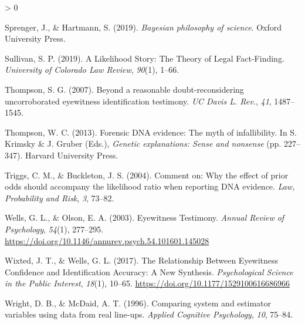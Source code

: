 \documentclass[
  10pt,
  dvipsnames,enabledeprecatedfontcommands]{scrartcl}
\newlength{\cslhangindent}
\newenvironment{CSLReferences}[2] %
 {%
  \setlength{\parindent}{0pt}
  \ifodd #1 \everypar{\setlength{\hangindent}{\cslhangindent}}\ignorespaces\fi
  \ifnum #2 > 0
  \setlength{\parskip}{#2\baselineskip}
  \fi
 }%
 {}
\begin{document}
\begin{CSLReferences}{1}{0}
\leavevmode\hypertarget{ref-sprenger2019bayesian}{}%
Sprenger, J., \& Hartmann, S. (2019). \emph{Bayesian philosophy of
science}. Oxford University Press.

\leavevmode\hypertarget{ref-sullivan2016LikelihoodStoryTheory}{}%
Sullivan, S. P. (2019). A {Likelihood Story}: {The Theory} of {Legal
Fact}-{Finding}. \emph{University of Colorado Law Review}, \emph{90}(1),
1--66.

\leavevmode\hypertarget{ref-thompson2007beyond}{}%
Thompson, S. G. (2007). Beyond a reasonable doubt-reconsidering
uncorroborated eyewitness identification testimony. \emph{UC Davis L.
Rev.}, \emph{41}, 1487--1545.

\leavevmode\hypertarget{ref-thompson2012forensic}{}%
Thompson, W. C. (2013). Forensic {DNA} evidence: The myth of
infallibility. In S. Krimsky \& J. Gruber (Eds.), \emph{Genetic
explanations: Sense and nonsense} (pp. 227--347). Harvard University
Press.

\leavevmode\hypertarget{ref-triggsCommentWhyEffect}{}%
Triggs, C. M., \& Buckleton, J. S. (2004). Comment on: {Why} the effect
of prior odds should accompany the likelihood ratio when reporting {DNA}
evidence. \emph{Law, Probability and Risk}, \emph{3}, 73--82.

\leavevmode\hypertarget{ref-wells2003EyewitnessTestimony}{}%
Wells, G. L., \& Olson, E. A. (2003). Eyewitness {Testimony}.
\emph{Annual Review of Psychology}, \emph{54}(1), 277--295.
\url{https://doi.org/10.1146/annurev.psych.54.101601.145028}

\leavevmode\hypertarget{ref-wixted2017RelationshipEyewitnessConfidence}{}%
Wixted, J. T., \& Wells, G. L. (2017). The {Relationship Between
Eyewitness Confidence} and {Identification Accuracy}: {A New Synthesis}.
\emph{Psychological Science in the Public Interest}, \emph{18}(1),
10--65. \url{https://doi.org/10.1177/1529100616686966}

\leavevmode\hypertarget{ref-Wright1996ComparingSystemEstimator}{}%
Wright, D. B., \& McDaid, A. T. (1996). Comparing system and estimator
variables using data from real line-ups. \emph{Applied Cognitive
Psychology}, \emph{10}, 75--84.

\end{CSLReferences}
\end{document}
